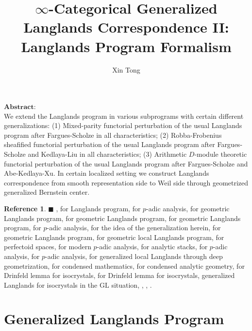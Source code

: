 \documentclass[12pt]{book}
\theoremstyle{definition}
\newtheorem{reference}{Reference}
\begin{document}
\title{$\infty$-Categorical Generalized Langlands Correspondence II: Langlands Program Formalism}
\author{Xin Tong}
\date{}

\maketitle

\newpage

\noindent $\mathbf{Abstract}$:\\
We extend the Langlands program in various subprograms with certain different generalizations: (1) Mixed-parity functorial perturbation of the usual Langlands program after Fargues-Scholze in all characteristics; (2) Robba-Frobenius sheafified functorial perturbation of the usual Langlands program after Fargues-Scholze and Kedlaya-Liu in all characteristics; (3) Arithmetic $D$-module theoretic functorial perturbation of the usual Langlands program after Fargues-Scholze and Abe-Kedlaya-Xu. In certain localized setting we construct Langlands correspondence from smooth representation side to Weil side through geometrized generalized Bernstein center.



\tableofcontents


\newpage
\begin{reference} $\blacksquare$ \cite{DHKM}, \cite{La} for Langlands program, \cite{Ta} for $p$-adic analysis, \cite{DI} for geometric Langlands program, \cite{DII} for geometric Langlands program, \cite{LLa} for geometric Langlands program, \cite{Fon} for $p$-adic analysis, \cite{BS} for the idea of the generalization herein, \cite{VLa} for geometric Langlands program, \cite{GL} for geometric local Langlands program, \cite{SchI} for perfectoid spaces, \cite{SchII} for modern $p$-adic analysis, \cite{SchIII} for analytic stacks, \cite{KLI} for $p$-adic analysis, \cite{KLII} for $p$-adic analysis, \cite{FS} for generalized local Langlands through deep geometrization, \cite{CSI} for condensed mathematics, \cite{CSII} for condensed analytic geometry, \cite{KI} for Drinfeld lemma for isocrystals, \cite{KXII} for Drinfeld lemma for isocrystals, \cite{AI} generalized Langlands for isocrystals in the $\mathrm{GL}$ situation, \cite{DK}, \cite{XZ}, \cite{Z}.
\end{reference}


\chapter{Generalized Langlands Program}
\end{document}
